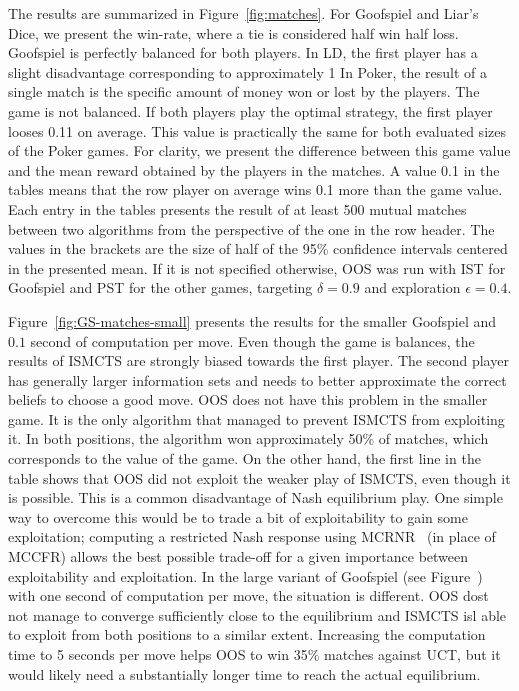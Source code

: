 \documentclass{aamas2015}
\newcounter{mlNoteCounter}
\newcommand{\mlnote}[1]{{\scriptsize \color{darkgreen} $\blacksquare$ \refstepcounter{mlNoteCounter}\textsf{[ML]$_{\arabic{mlNoteCounter}}$:{#1}}}}
\renewcommand{\mlnote}[1]{}
\begin{document}


The results are summarized in Figure~\ref{fig:matches}.
For Goofspiel and Liar's Dice, we present the win-rate, where a tie is considered half win half loss. Goofspiel is perfectly balanced for both players. In LD, the first player has a slight disadvantage corresponding to approximately 1 \mlnote{...?} %
In Poker, the result of a single match is the specific amount of money won or lost by the players.
The game is not balanced. If both players play the optimal strategy, the first player looses 0.11 on average.
This value is practically the same for both evaluated sizes of the Poker games.
For clarity, we present the difference between this game value and the mean reward obtained by the players in the matches. A value 0.1 in the tables means that the row player on average wins 0.1 more than the game value.
Each entry in the tables presents the result of at least 500 mutual matches between two algorithms from the perspective of the one in the row header. The values in the brackets are the size of half of the 95\% confidence intervals centered in the presented mean. If it is not specified otherwise, OOS was run with IST for Goofspiel and PST for the other games, targeting $\delta=0.9$ and exploration $\epsilon=0.4$.

Figure~\ref{fig:GS-matches-small} presents the results for the smaller Goofspiel and $0.1$ second of computation per move. Even though the game is balances, the results of ISMCTS are strongly biased towards the first player. The second player has generally larger information sets and needs to better approximate the correct beliefs to choose a good move. OOS does not have this problem in the smaller game. It is the only algorithm that managed to prevent ISMCTS from exploiting it.
In both positions, the algorithm won approximately 50\% of matches, which corresponds to the value of the game.
On the other hand, the first line in the table shows that OOS did not exploit the weaker play of ISMCTS, even though it is possible. This is a common disadvantage of Nash equilibrium play. %
One simple way to overcome this would be to trade a bit of exploitability to gain some exploitation; computing a restricted Nash response using  MCRNR~\cite{Ponsen11Computing} (in place of MCCFR) allows the best possible trade-off for a given importance between exploitability and exploitation. 
In the large variant of Goofspiel (see Figure~\cite{fig:GS-matches-small}) with one second of computation per move, the situation is different. OOS dost not manage to converge sufficiently close to the equilibrium and ISMCTS isl able to exploit from both positions to a similar extent. Increasing the computation time to 5 seconds per move helps OOS to win 35\% matches against UCT, but it would likely need a substantially longer time to reach the actual equilibrium.
\end{document}
